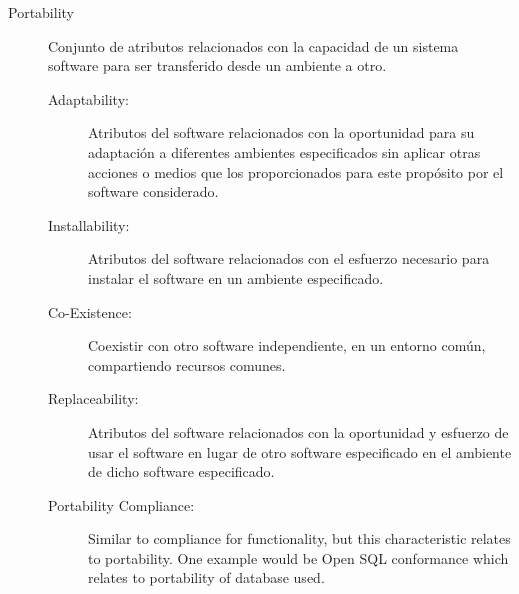 \begin{description}
  \item[Portability] Conjunto de atributos relacionados con la 
capacidad de un sistema software para ser transferido desde un
ambiente a otro.
	\SpecialItem
	\begin{description}
  		\item[Adaptability:] Atributos del software relacionados 
con la oportunidad para su adaptación a diferentes ambientes 
especificados sin aplicar otras acciones o medios que los 
proporcionados para este propósito por el software considerado.
  		\item[Installability:] Atributos del software relacionados con 
el esfuerzo necesario para instalar el software en un 
ambiente especificado.
  		\item[Co-Existence:] Coexistir con otro software 
independiente, en un entorno común, compartiendo 
recursos comunes.
		\item[Replaceability:] Atributos del software relacionados 
con la oportunidad y esfuerzo de usar el software en lugar de otro 
software especificado en el ambiente de dicho software 
especificado.
		\item[Portability Compliance:] Similar to compliance for 
functionality, but this characteristic relates to portability. 
One example would be Open SQL conformance which relates 
to portability of database used.
	\end{description}
\end{description}



